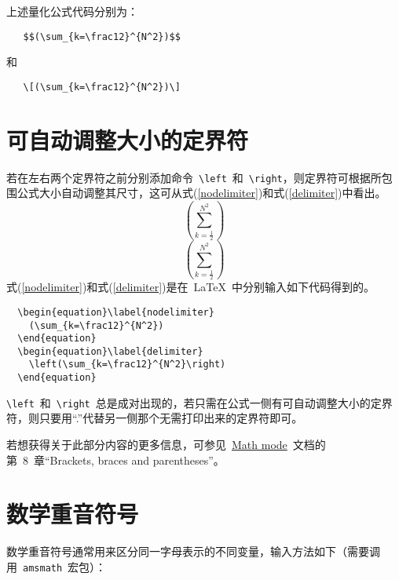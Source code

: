 上述量化公式代码分别为：
\begin{lstlisting}
   $$(\sum_{k=\frac12}^{N^2})$$
 \end{lstlisting}
和
\begin{lstlisting}
   \[(\sum_{k=\frac12}^{N^2})\]
 \end{lstlisting}

\section{可自动调整大小的定界符}

若在左右两个定界符之前分别添加命令~\verb|\left|~和~\verb|\right|，则定界符可根据所包围公式大小自动调整其尺寸，这可从式(\ref{nodelimiter})和式(\ref{delimiter})中看出。
\begin{equation}\label{nodelimiter}
  (\sum_{k=\frac12}^{N^2})
\end{equation}
\begin{equation}\label{delimiter}
  \left(\sum_{k=\frac12}^{N^2}\right)
\end{equation}
式(\ref{nodelimiter})和式(\ref{delimiter})是在~\LaTeX~中分别输入如下代码得到的。
\begin{lstlisting}
  \begin{equation}\label{nodelimiter}
    (\sum_{k=\frac12}^{N^2})
  \end{equation}
  \begin{equation}\label{delimiter}
    \left(\sum_{k=\frac12}^{N^2}\right)
  \end{equation}
\end{lstlisting}

\verb|\left|~和~\verb|\right|~总是成对出现的，若只需在公式一侧有可自动调整大小的定界符，则只要用“.”代替另一侧那个无需打印出来的定界符即可。

若想获得关于此部分内容的更多信息，可参见~\href{http://tug.ctan.org/cgi-bin/ctanPackageInformation.py?id=voss-mathmode}{Math mode}~文档的第~8~章“Brackets, braces and parentheses”。

\section{数学重音符号}

数学重音符号通常用来区分同一字母表示的不同变量，输入方法如下（需要调用~\verb|amsmath|~宏包）：

